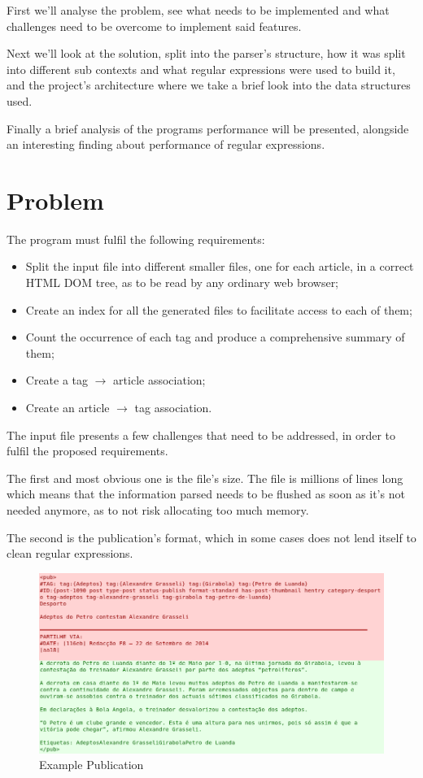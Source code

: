 \documentclass[a4paper]{report}
\begin{document}
First we'll analyse the problem, see what needs to be implemented and what
challenges need to be overcome to implement said features.

Next we'll look at the solution, split into the parser's structure, how it was
split into different sub contexts and what regular expressions were used to
build it, and the project's architecture where we take a brief look into the
data structures used.

Finally a brief analysis of the programs performance will be presented,
alongside an interesting finding about performance of regular expressions.

\chapter{Problem}

The program must fulfil the following requirements:
\begin{itemize}
    \item Split the input file into different smaller files, one for each
        article, in a correct HTML DOM tree, as to be read by any ordinary web
        browser;
    \item Create an index for all the generated files to facilitate access to
        each of them;
    \item Count the occurrence of each tag and produce a comprehensive summary
        of them;
    \item Create a tag $\to$ article association;
    \item Create an article $\to$ tag association.
\end{itemize}

The input file presents a few challenges that need to be addressed, in order to fulfil the proposed requirements.

The first and most obvious one is the file's size. The file is millions of lines long
which means that the information parsed needs to be flushed as soon as it's not
needed anymore, as to not risk allocating too much memory.

The second is the publication's format, which in some cases does not lend
itself to clean regular expressions.

\begin{figure}[H]
    \includegraphics[width=\textwidth]{./example_pub_colored_simple.png}
    \caption{Example Publication}\label{fig:example_pub_simple}
\end{figure}
\end{document}
